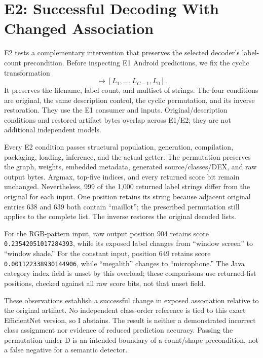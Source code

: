 \documentclass[10pt,twocolumn,letterpaper]{article}
\newcommand{\code}[1]{\texttt{#1}}
\begin{document}
\section{E2: Successful Decoding With Changed Association}
\label{sec:e2}
E2 tests a complementary intervention that preserves the selected decoder's label-count precondition. Before inspecting E1 Android predictions, we fix the cyclic transformation
\begin{equation}
[L_0,L_1,\ldots,L_{C-1}]\mapsto[L_1,\ldots,L_{C-1},L_0].
\end{equation}
It preserves the filename, label count, and multiset of strings. The four conditions are original, the same description control, the cyclic permutation, and its inverse restoration. They use the E1 consumer and inputs. Original/description conditions and restored artifact bytes overlap across E1/E2; they are not additional independent models.

Every E2 condition passes structural population, generation, compilation, packaging, loading, inference, and the actual getter. The permutation preserves the graph, weights, embedded metadata, generated source/classes/DEX, and raw output bytes. Argmax, top-five indices, and every returned score bit remain unchanged. Nevertheless, 999 of the 1,000 returned label strings differ from the original for each input. One position retains its string because adjacent original entries 638 and 639 both contain ``maillot''; the prescribed permutation still applies to the complete list. The inverse restores the original decoded lists.

For the RGB-pattern input, raw output position 904 retains score \code{0.23542051017284393}, while its exposed label changes from ``window screen'' to ``window shade.'' For the constant input, position 649 retains score \code{0.001122338930144906}, while ``megalith'' changes to ``microphone.'' The Java category index field is unset by this overload; these comparisons use returned-list positions, checked against all raw score bits, not that unset field.

These observations establish a successful change in exposed association relative to the original artifact. No independent class-order reference is tied to this exact EfficientNet version, so I abstains. The result is neither a demonstrated incorrect class assignment nor evidence of reduced prediction accuracy. Passing the permutation under D is an intended boundary of a count/shape precondition, not a false negative for a semantic detector.
\end{document}
